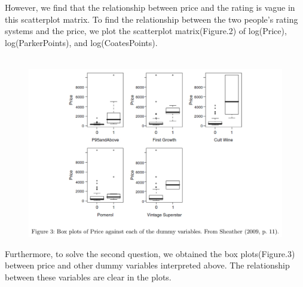 \documentclass[11pt]{article}
\begin{document}
However, we find that the relationship between price and the rating is vague in this scatterplot matrix. To find the relationship between the two people's rating systems and the price, we plot the scatterplot matrix(Figure.2) of log(Price), log(ParkerPoints), and log(CoatesPoints).\\\\
\begin{figure}[h]
    \centering
    \includegraphics[width=15cm]{Fig03.jpg}
    \label{fig:galaxy}
\end{figure}
Furthermore, to solve the second question, we obtained the box plots(Figure.3) between price and other dummy variables interpreted above. The relationship between these variables are clear in the plots.
\end{document}
